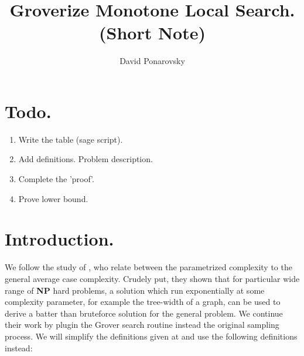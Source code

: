 \documentclass[manuscript,screen,review]{acmart}
\begin{document}


\title{Groverize Monotone Local Search. (Short Note)} 
\author{David Ponarovsky}

\ifdefined\ACM
\else
  \maketitle
\fi
%
\ifdefined\ACM
  \maketitle
\fi

% 
%


\newcommand{\Oh}{{\mathcal{O}}}
\newcommand{\bitsize}{N}
\newcommand{\longversion}[1]{#1}
\newcommand{\abpartization}{{\sc Vertex $(r,\ell)$-Partization}}


\section{Todo.}
\begin{enumerate}
  \item Write the table (sage script).
  \item Add definitions. Problem description.  
  \item Complete the 'proof'. 
  \item Prove lower bound. 
\end{enumerate}

\section{Introduction.} We follow the study of \cite{fomin2015exact}, who relate between the parametrized complexity to the general average case complexity. Crudely put, they shown that for particular wide range of \textbf{NP} hard problems, a solution which run exponentially at some complexity parameter, for example the tree-width of a graph, can be used to derive a batter than bruteforce solution for the general problem. We continue their work by plugin the Grover search   \cite{grover1996fast} routine instead the original sampling process.  We will simplify the definitions given at \cite{fomin2015exact} and use the following definitions instead:
 
\end{document}
